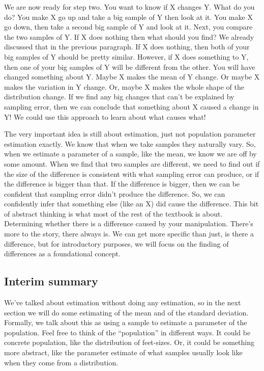 \documentclass[]{book}
\begin{document}
We are now ready for step two. You want to know if X changes Y. What do you do? You make X go up and take a big sample of Y then look at it. You make X go down, then take a second big sample of Y and look at it. Next, you compare the two samples of Y. If X does nothing then what should you find? We already discussed that in the previous paragraph. If X does nothing, then both of your big samples of Y should be pretty similar. However, if X does something to Y, then one of your big samples of Y will be different from the other. You will have changed something about Y. Maybe X makes the mean of Y change. Or maybe X makes the variation in Y change. Or, maybe X makes the whole shape of the distribution change. If we find any big changes that can't be explained by sampling error, then we can conclude that something about X caused a change in Y! We could use this approach to learn about what causes what!

The very important idea is still about estimation, just not population parameter estimation exactly. We know that when we take samples they naturally vary. So, when we estimate a parameter of a sample, like the mean, we know we are off by some amount. When we find that two samples are different, we need to find out if the size of the difference is consistent with what sampling error can produce, or if the difference is bigger than that. If the difference is bigger, then we can be confident that sampling error didn't produce the difference. So, we can confidently infer that something else (like an X) did cause the difference. This bit of abstract thinking is what most of the rest of the textbook is about. Determining whether there is a difference caused by your manipulation. There's more to the story, there always is. We can get more specific than just, is there a difference, but for introductory purposes, we will focus on the finding of differences as a foundational concept.

\hypertarget{interim-summary}{%
\subsection{Interim summary}\label{interim-summary}}

We've talked about estimation without doing any estimation, so in the next section we will do some estimating of the mean and of the standard deviation. Formally, we talk about this as using a sample to estimate a parameter of the population. Feel free to think of the ``population'' in different ways. It could be concrete population, like the distribution of feet-sizes. Or, it could be something more abstract, like the parameter estimate of what samples usually look like when they come from a distribution.
\end{document}
